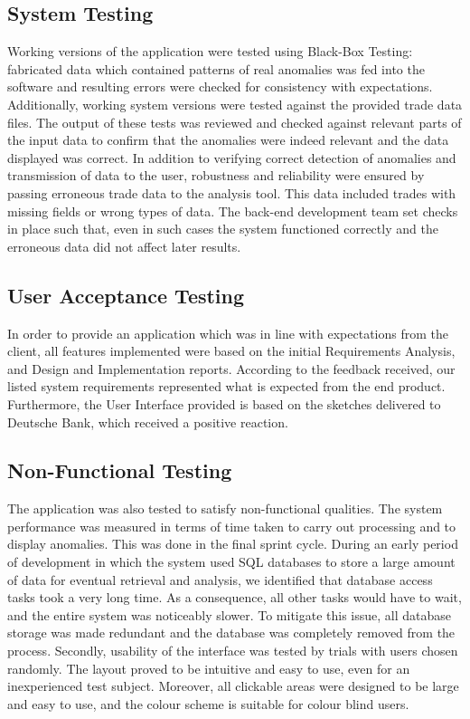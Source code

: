 \documentclass[12pt]{article}
\begin{document}
    \subsection{System Testing}
    Working versions of the application were tested using Black-Box Testing: fabricated data which contained patterns of real anomalies was fed into the software and resulting errors were checked for consistency with expectations. Additionally, working system versions were tested against the provided trade data files.
    The output of these tests was reviewed and checked against relevant parts of the input data to confirm that the anomalies were indeed relevant and the data displayed was correct.
  	In addition to verifying correct detection of anomalies and transmission of data to the user, robustness and reliability were ensured by passing erroneous trade data to the analysis tool.
    This data included trades with missing fields or wrong types of data. The back-end development team set checks in place such that, even in such cases the system functioned correctly and the erroneous data did not affect later results.
    \subsection{User Acceptance Testing}
    In order to provide an application which was in line with expectations from the client, all features implemented were based on the initial Requirements Analysis, and Design and Implementation reports. According to the feedback received, our listed system requirements represented what is expected from the end product.
    Furthermore, the User Interface provided is based on the sketches delivered to Deutsche Bank, which received a positive reaction.
    \subsection{Non-Functional Testing}
    The application was also tested to satisfy non-functional qualities. The system performance was measured in terms of time taken to carry out processing and to display anomalies.
    This was done in the final sprint cycle. During an early period of development in which the system used SQL databases to store a large amount of data for eventual retrieval and analysis, we identified that database access tasks took a very long time.
    As a consequence, all other tasks would have to wait, and the entire system was noticeably slower. To mitigate this issue, all database storage was made redundant and the database was completely removed from the process.
  	Secondly, usability of the interface was tested by trials with users chosen randomly. The layout proved to be intuitive and easy to use, even for an inexperienced test subject. Moreover, all clickable areas were designed to be large and easy to use, and the colour scheme is suitable for colour blind users.
\end{document}
